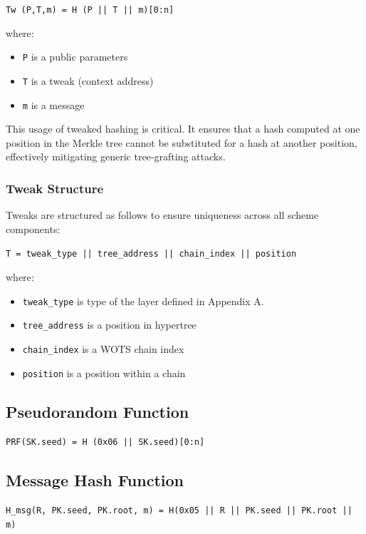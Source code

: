 \begin{center}
\texttt{Tw (P,T,m) = H (P || T || m)[0:n]}
\end{center}
where: 
\begin{itemize}
    \item[] \texttt{P} is a public parameters
    \item[] \texttt{T} is a tweak  (context address)
    \item[] \texttt{m} is a message
\end{itemize}

This usage of tweaked hashing is critical. It ensures that a hash computed at one position in the 
Merkle tree cannot be substituted for a hash at another position, effectively mitigating generic 
tree-grafting attacks.

\subsubsection{Tweak Structure}

Tweaks are structured as follows to ensure uniqueness across all scheme components:

\begin{center}
\texttt{T = tweak\_type || tree\_address || chain\_index || position}
\end{center}
where: 
\begin{itemize}
    \item[] \texttt{tweak\_type} is type of the layer defined in Appendix A.
    \item[] \texttt{tree\_address} is a position in hypertree
    \item[] \texttt{chain\_index} is a WOTS chain index
    \item[] \texttt{position} is a position within a chain
\end{itemize}

\subsection{Pseudorandom Function}

\texttt{PRF(SK.seed) = H (0x06 || SK.seed)[0:n]}

\subsection{Message Hash Function}

\texttt{H\_msg(R, PK.seed, PK.root, m) = H(0x05 || R || PK.seed || PK.root || m)}

